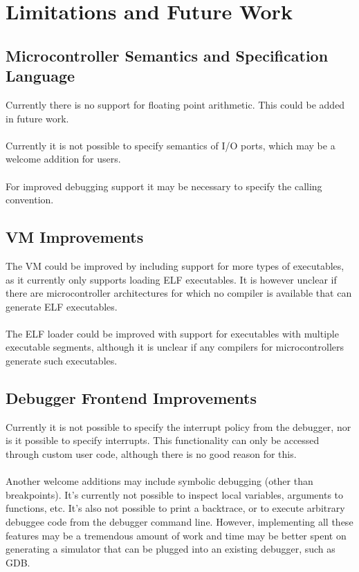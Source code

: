 \chapter{Limitations and Future Work}

\section{Microcontroller Semantics and Specification Language}
Currently there is no support for floating point arithmetic. This could be
added in future work.\\
\\
Currently it is not possible to specify semantics of I/O ports, which may be a
welcome addition for users.\\
\\
For improved debugging support it may be necessary to specify the calling
convention.

\section{VM Improvements}
The VM could be improved by including support for more types of executables, as
it currently only supports loading ELF executables. It is however unclear if there are
microcontroller architectures for which no compiler is available that can
generate ELF executables.\\
\\
The ELF loader could be improved with support for executables with multiple 
executable segments, although it is unclear if any compilers for microcontrollers
generate such executables.

\section{Debugger Frontend Improvements}
Currently it is not possible to specify the interrupt policy from the
debugger, nor is it possible to specify interrupts. This functionality can
only be accessed through custom user code, although there is no good reason
for this.\\
\\
Another welcome additions may include symbolic debugging (other than
breakpoints). It's currently not possible to inspect local variables,
arguments to functions, etc. It's also not possible to print a backtrace, or
to execute arbitrary debuggee code from the debugger command line. 
However, implementing all these
features may be a tremendous amount of work and time may be better spent on
generating a simulator that can be plugged into an existing debugger, such as
GDB.


